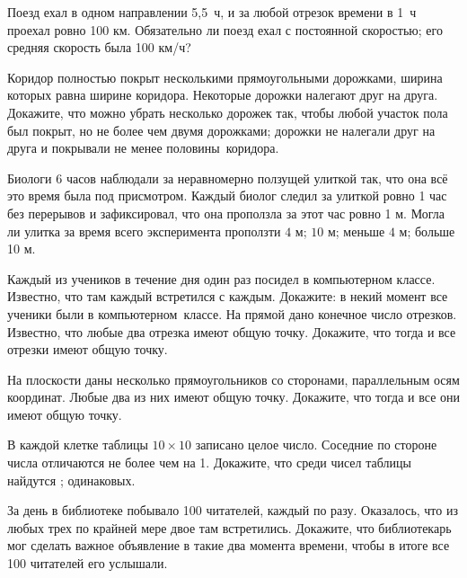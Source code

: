 \documentclass[a4paper, 12pt]{article}
\begin{document}


\vspace*{1mm}

Поезд ехал в одном направлении 5,5~ч, и за любой
отрезок времени в 1~ч проехал ровно 100 км. Обязательно ли %
поезд ехал с постоянной скоростью;
его средняя скорость была 100 км/ч?

Коридор полностью покрыт несколькими прямоугольными
дорожками, ширина которых равна ширине коридора.
Некоторые  дорожки налегают друг на друга. Докажите, что
можно убрать несколько дорожек так, чтобы
  любой участок пола был покрыт, но не более чем двумя дорожками;
дорожки не налегали друг на друга и покрывали не менее
половины~коридора.

Биологи 6 часов наблюдали за неравномерно ползущей улиткой так, что она всё это время была под
присмотром. Каждый биолог следил за улиткой ровно 1 час без перерывов
и зафиксировал, что она проползла за этот час ровно 1 м.
Могла ли улитка за время всего эксперимента проползти
 $4$ м;  $10$ м;  меньше $4$ м;  больше 10 м.


\vspace*{-1mm}
 Каждый из учеников в течение дня один раз посидел в компьютерном классе. Известно, что там каждый встретился с каждым. Докажите: в некий момент все ученики были в компьютерном~классе.
 На прямой дано конечное число отрезков. Известно, что любые два отрезка имеют общую точку. Докажите, что тогда и все отрезки имеют общую точку.

 На плоскости даны несколько прямоугольников со сторонами, параллельным осям координат. Любые два из них имеют общую точку. Докажите, что тогда и все они имеют общую точку.

В каждой клетке таблицы $10\times10$ записано целое число. Соседние по стороне числа отличаются не более чем на 1.
Докажите, что среди чисел таблицы найдутся ;  одинаковых.

За день в библиотеке побывало 100 читателей, каждый по разу. Оказалось, что из любых трех по крайней мере двое там встретились. Докажите, что библиотекарь мог сделать важное объявление в такие два момента времени, чтобы в итоге все 100 читателей его услышали.
\end{document}
